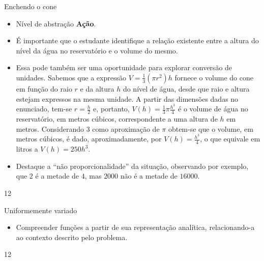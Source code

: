 \marginpar{\vspace{-2em}}
\begin{sugestions}{Enchendo o cone}
{
\begin{itemize}
\item Nível de abstração \textbf{Ação}.

\item É importante que o estudante identifique a relação existente entre a altura do nível da água no reservatório e o volume do mesmo.

\item Essa pode também ser uma oportunidade para explorar conversão de unidades. Sabemos que a expressão $V=\frac{1}{3}(\pi r^2)h$ fornece o volume do cone em função do raio $r$ e da altura $h$ do nível de água, desde que raio e altura estejam expressos na mesma unidade. A partir das dimensões dadas no enunciado, tem-se $r=\frac{h}{2}$ e, portanto, $V(h)=\frac{1}{3}\pi\frac{h^3}{4}$ é o volume de água no reservatório, em metros cúbicos, correspondente a uma altura de $h$ em metros. Considerando $3$ como aproximação de $\pi$ obtem-se que o volume, em metros cúbicos, é dado, aproximadamente, por $V(h)=\frac{h^3}{4}$, o que equivale em litros a $V(h)=250h^3$.

\item Destaque a “não proporcionalidade” da situação, observando por exemplo, que $2$ é a metade de $4$, mas $2000$ não é a metade de $16000$.
\end{itemize}
}{1}{2}
\end{sugestions}
\marginpar{\vspace{-2em}}
\begin{objectives}{Uniformemente variado}
{
\begin{itemize}

\item Compreender funções a partir de sua representação analítica, relacionando-a ao contexto descrito pelo problema.

\end{itemize}
}{1}{2}
\end{objectives}

